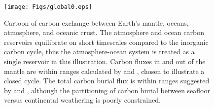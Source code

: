 \documentclass[authoryear,round,12pt]{article}
\begin{document}
\begin{figure}[!hb]
\begin{center}
  \texttt{[image: Figs/global0.eps]}
\end{center}
\caption{Cartoon of carbon exchange between
      Earth's mantle, oceans, atmosphere, and oceanic crust. The
      atmosphere and ocean carbon reservoirs equilibrate on short
      timescales compared to the inorganic carbon cycle, thus the
      atmosphere-ocean system is treated as a single reservoir in this
      illustration. Carbon fluxes in and out of the mantle are within
      ranges calculated by \citet{gerlach1989} and \citet{sano1996},
      chosen to illustrate a closed cycle. The total carbon burial
      flux is within ranges suggested by \citet{alt1999} and
      \citet{staudigel1989}, although the partitioning of 
      carbon burial between seafloor versus continental weathering is
      poorly constrained.  
}
\label{fig:global}
\end{figure}

\end{document}
